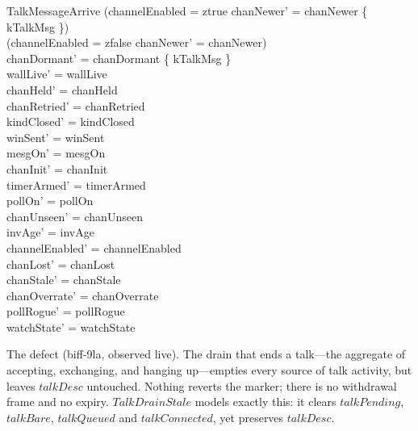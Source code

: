 \documentclass[a4paper,10pt,fleqn]{article}
\begin{document}
\begin{schema}{TalkMessageArrive}
  (channelEnabled = ztrue \implies
  chanNewer' = chanNewer \cup \{ kTalkMsg \}) \\
  (channelEnabled = zfalse \implies chanNewer' = chanNewer) \\
  chanDormant' = chanDormant \setminus \{ kTalkMsg \} \\
  wallLive' = wallLive \\
  chanHeld' = chanHeld \\
  chanRetried' = chanRetried \\
  kindClosed' = kindClosed \\
  winSent' = winSent \\
  mesgOn' = mesgOn \\
  chanInit' = chanInit \\
  timerArmed' = timerArmed \\
  pollOn' = pollOn \\
  chanUnseen' = chanUnseen \\
  invAge' = invAge \\
  channelEnabled' = channelEnabled \\
  chanLost' = chanLost \\
  chanStale' = chanStale \\
  chanOverrate' = chanOverrate \\
  pollRogue' = pollRogue \\
  watchState' = watchState
\end{schema}

The defect (biff-9la, observed live).  The drain that ends a talk---the
aggregate of accepting, exchanging, and hanging up---empties every source
of talk activity, but leaves $talkDesc$ untouched.  Nothing reverts the
marker; there is no withdrawal frame and no expiry.  $TalkDrainStale$
models exactly this: it clears $talkPending$, $talkBare$, $talkQueued$
and $talkConnected$, yet preserves $talkDesc$.
\end{document}

